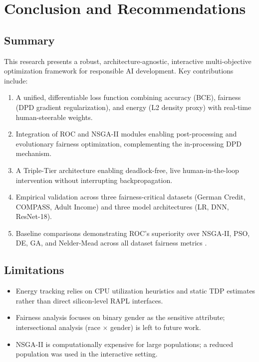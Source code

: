 \documentclass[12pt,a4paper]{article}
\begin{document}
\section{Conclusion and Recommendations}

\subsection{Summary}

This research presents a robust, architecture-agnostic, interactive multi-objective optimization framework for responsible AI development. Key contributions include:

\begin{enumerate}
    \item A unified, differentiable loss function combining accuracy (BCE), fairness (DPD gradient regularization), and energy (L2 density proxy) with real-time human-steerable weights.
    \item Integration of ROC and NSGA-II modules enabling post-processing and evolutionary fairness optimization, complementing the in-processing DPD mechanism.
    \item A Triple-Tier architecture enabling deadlock-free, live human-in-the-loop intervention without interrupting backpropagation.
    \item Empirical validation across three fairness-critical datasets (German Credit, COMPASS, Adult Income) and three model architectures (LR, DNN, ResNet-18).
    \item Baseline comparisons demonstrating ROC's superiority over NSGA-II, PSO, DE, GA, and Nelder-Mead across all dataset fairness metrics \cite{rN2024multiobj}.
\end{enumerate}

\subsection{Limitations}

\begin{itemize}
    \item Energy tracking relies on CPU utilization heuristics and static TDP estimates rather than direct silicon-level RAPL interfaces.
    \item Fairness analysis focuses on binary gender as the sensitive attribute; intersectional analysis (race $\times$ gender) is left to future work.
    \item NSGA-II is computationally expensive for large populations; a reduced population was used in the interactive setting.
\end{itemize}
\end{document}
